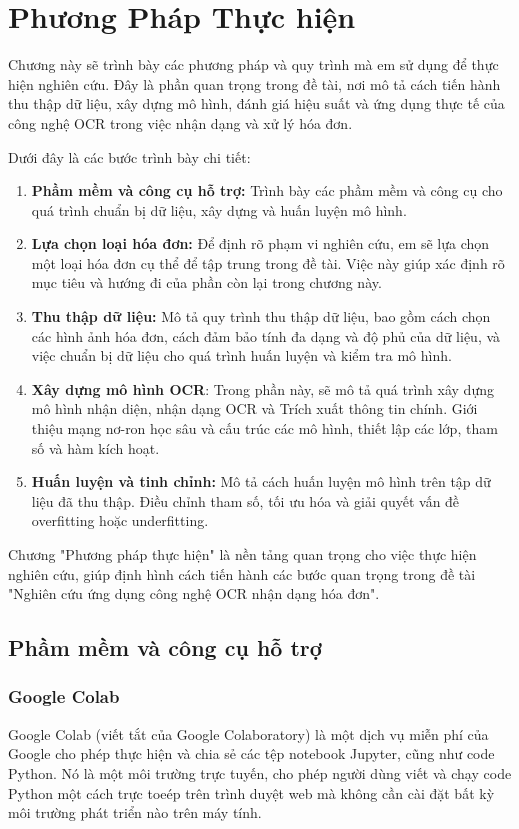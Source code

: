 \section{Phương Pháp Thực hiện}
Chương này sẽ trình bày các phương pháp và quy trình mà em sử dụng để thực hiện nghiên cứu. Đây là phần quan trọng trong đề tài, nơi mô tả cách tiến hành thu thập dữ liệu, xây dựng mô hình, đánh giá hiệu suất và ứng dụng thực tế của công nghệ OCR trong việc nhận dạng và xử lý hóa đơn.

Dưới đây là các bước trình bày chi tiết:
\begin{enumerate}
    \item \textbf{Phầm mềm và công cụ hỗ trợ:} Trình bày các phầm mềm và công cụ cho quá trình chuẩn bị dữ liệu, xây dựng và huấn luyện mô hình.
    \item \textbf{Lựa chọn loại hóa đơn:} Để định rõ phạm vi nghiên cứu, em sẽ lựa chọn một loại hóa đơn cụ thể để tập trung trong đề tài. Việc này giúp xác định rõ mục tiêu và hướng đi của phần còn lại trong chương này.
    \item \textbf{Thu thập dữ liệu:} Mô tả quy trình thu thập dữ liệu, bao gồm cách chọn các hình ảnh hóa đơn, cách đảm bảo tính đa dạng và độ phủ của dữ liệu, và việc chuẩn bị dữ liệu cho quá trình huấn luyện và kiểm tra mô hình.
    \item \textbf{Xây dựng mô hình OCR}: Trong phần này, sẽ mô tả quá trình xây dựng mô hình nhận diện, nhận dạng OCR và Trích xuất thông tin chính. Giới thiệu mạng nơ-ron học sâu và cấu trúc các mô hình, thiết lập các lớp, tham số và hàm kích hoạt.
    \item \textbf{Huấn luyện và tinh chỉnh:} Mô tả cách huấn luyện mô hình trên tập dữ liệu đã thu thập. Điều chỉnh tham số, tối ưu hóa và giải quyết vấn đề overfitting hoặc underfitting.

\end{enumerate}

Chương "Phương pháp thực hiện" là nền tảng quan trọng cho việc thực hiện nghiên cứu, giúp định hình cách tiến hành các bước quan trọng trong đề tài "Nghiên cứu ứng dụng công nghệ OCR nhận dạng hóa đơn".

\subsection{Phầm mềm và công cụ hỗ trợ}
\subsubsection{Google Colab}
Google Colab (viết tắt của Google Colaboratory) là một dịch vụ miễn phí của Google cho phép thực hiện và chia sẻ các tệp notebook Jupyter, cũng như code Python. Nó là một môi trường trực tuyến, cho phép người dùng viết và chạy code Python một cách trực toeép trên trình duyệt web mà không cần cài đặt bất kỳ môi trường phát triển nào trên máy tính.

